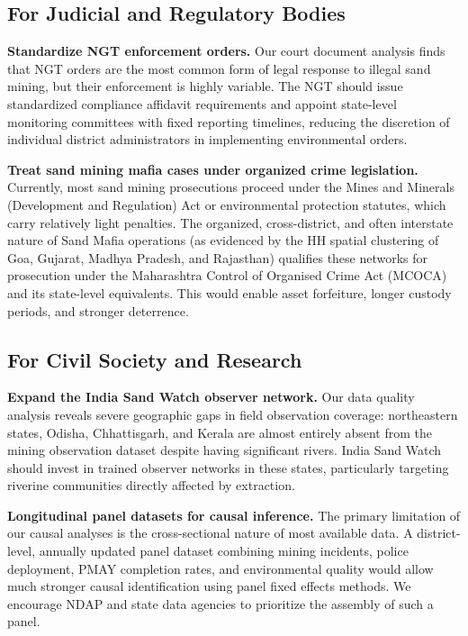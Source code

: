 \documentclass[12pt]{article}
\begin{document}
\subsection{For Judicial and Regulatory Bodies}

\textbf{Standardize NGT enforcement orders.} Our court document analysis finds that NGT orders are the most common form of legal response to illegal sand mining, but their enforcement is highly variable. The NGT should issue standardized compliance affidavit requirements and appoint state-level monitoring committees with fixed reporting timelines, reducing the discretion of individual district administrators in implementing environmental orders.

\textbf{Treat sand mining mafia cases under organized crime legislation.} Currently, most sand mining prosecutions proceed under the Mines and Minerals (Development and Regulation) Act or environmental protection statutes, which carry relatively light penalties. The organized, cross-district, and often interstate nature of Sand Mafia operations (as evidenced by the HH spatial clustering of Goa, Gujarat, Madhya Pradesh, and Rajasthan) qualifies these networks for prosecution under the Maharashtra Control of Organised Crime Act (MCOCA) and its state-level equivalents. This would enable asset forfeiture, longer custody periods, and stronger deterrence.

\subsection{For Civil Society and Research}

\textbf{Expand the India Sand Watch observer network.} Our data quality analysis reveals severe geographic gaps in field observation coverage: northeastern states, Odisha, Chhattisgarh, and Kerala are almost entirely absent from the mining observation dataset despite having significant rivers. India Sand Watch should invest in trained observer networks in these states, particularly targeting riverine communities directly affected by extraction.

\textbf{Longitudinal panel datasets for causal inference.} The primary limitation of our causal analyses is the cross-sectional nature of most available data. A district-level, annually updated panel dataset combining mining incidents, police deployment, PMAY completion rates, and environmental quality would allow much stronger causal identification using panel fixed effects methods. We encourage NDAP and state data agencies to prioritize the assembly of such a panel.
\end{document}
